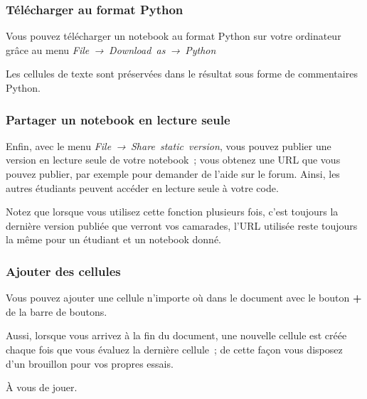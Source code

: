    \hypertarget{tuxe9luxe9charger-au-format-python}{%
\subsubsection{Télécharger au format
Python}\label{tuxe9luxe9charger-au-format-python}}

    Vous pouvez télécharger un notebook au format Python sur votre
ordinateur grâce au menu \emph{File~→~Download~as~→~Python}

    Les cellules de texte sont préservées dans le résultat sous forme de
commentaires Python.

    \hypertarget{partager-un-notebook-en-lecture-seule}{%
\subsubsection{Partager un notebook en lecture
seule}\label{partager-un-notebook-en-lecture-seule}}

    Enfin, avec le menu \emph{File~→~Share~static~version}, vous pouvez
publier une version en lecture seule de votre notebook~; vous obtenez
une URL que vous pouvez publier, par exemple pour demander de l'aide sur
le forum. Ainsi, les autres étudiants peuvent accéder en lecture seule à
votre code.

    Notez que lorsque vous utilisez cette fonction plusieurs fois, c'est
toujours la dernière version publiée que verront vos camarades, l'URL
utilisée reste toujours la même pour un étudiant et un notebook donné.

    \hypertarget{ajouter-des-cellules}{%
\subsubsection{Ajouter des cellules}\label{ajouter-des-cellules}}

    Vous pouvez ajouter une cellule n'importe où dans le document avec le
bouton \textbf{+} de la barre de boutons.

Aussi, lorsque vous arrivez à la fin du document, une nouvelle cellule
est créée chaque fois que vous évaluez la dernière cellule~; de cette
façon vous disposez d'un brouillon pour vos propres essais.

À vous de jouer.


    
    
    
